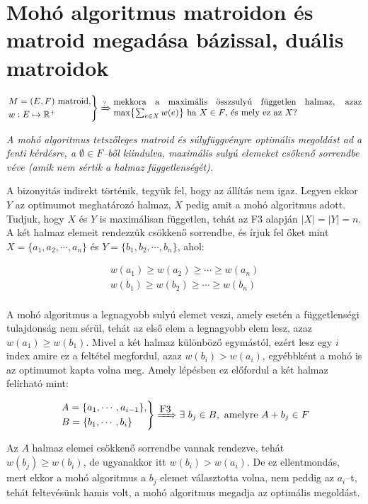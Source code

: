 \section{Mohó algoritmus matroidon és matroid megadása bázissal, duális matroidok}

\[
\begin{rcases}
M=(E,F) \mbox{ matroid}, \\ 
w : E \mapsto \mathbb{R}^+
\end{rcases}
\xRightarrow{?} \parbox[L]{9.8cm}{mekkora a maximális összsulyú független halmaz,
azaz max$\left\{\sum_{e \in X}w(e)\right\}$ ha $X \in F$, és mely ez az $X$?}
\]

\vspace{0.4cm}
\emph{A mohó algoritmus tetszőleges matroid és súlyfüggvényre optimális
megoldást ad a fenti kérdésre, a $\emptyset \in F$--ből kiindulva, maximális
sulyú elemeket csökenő sorrendbe véve (amik nem sértik a halmaz
függetlenségét).}
\vspace{0.4cm}

A bizonyitás indirekt történik, tegyük fel, hogy az állítás nem igaz. Legyen
ekkor $Y$ az optimumot meghatározó halmaz, $X$ pedig amit a mohó algoritmus adott. Tudjuk,
hogy $X$ és $Y$ is maximálisan független, tehát az F$3$ alapján $|X|=|Y|=n$. A
két halmaz elemeit rendezzük csökkenő sorrendbe, és írjuk fel őket mint
$X=\{a_1, a_2, \cdots, a_n\}$ és $Y=\{b_1, b_2, \cdots, b_n\}$, ahol:

\begin{align*}
w(a_1) \geq w(a_2) \geq \cdots \geq w(a_n) \\
w(b_1) \geq w(b_2) \geq \cdots \geq w(b_n) \\
\end{align*}

A mohó algoritmus a legnagyobb sulyú elemet veszi, amely esetén a
függetlenségi tulajdonság nem sérül, tehát az első elem a legnagyobb elem lesz,
azaz $w(a_1) \geq w(b_1)$. Mivel a két halmaz különböző egymástól, ezért lesz
egy $i$ index amire ez a feltétel megfordul, azaz $ w(b_i)> w(a_i)$, egyébbként
a mohó is az optimumot kapta volna meg. Amely lépésben ez előfordul a két halmaz
felírható mint:

\[
\begin{rcases}
A=\{a_1, \cdots, a_{i-1}\}, \\
B=\{b_1, \cdots, b_{i}\}
\end{rcases} 
\xRightarrow{\mbox{F3}} \exists~b_j \in B, \mbox{ amelyre } A + b_j \in F  
\]

Az $A$ halmaz elemei csökkenő sorrendbe vannak rendezve, tehát $w(b_j) \geq
w(b_i)$, de ugyanakkor itt $w(b_i) > w(a_i)$. De ez ellentmondás, mert ekkor a
mohó algoritmus a $b_j$ elemet választotta volna, nem peddig az $a_i$--t, tehát
feltevésünk hamis volt, a mohó algoritmus megadja az optimális megoldást.

